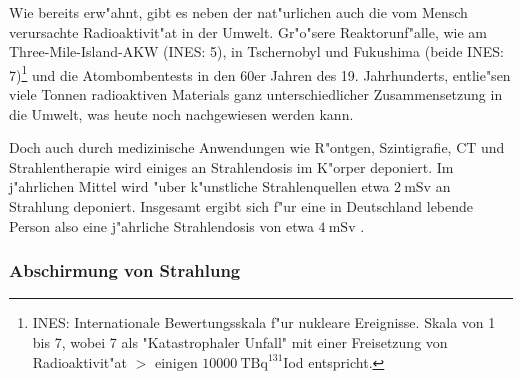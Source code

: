 \documentclass[12pt]{article}
\begin{document}
Wie bereits erw"ahnt, gibt es neben der nat"urlichen auch die vom Mensch verursachte Radioaktivit"at in der Umwelt. Gr"o"sere Reaktorunf"alle, wie am Three-Mile-Island-AKW (INES: 5), in Tschernobyl und Fukushima (beide INES: 7)\footnote{INES: Internationale Bewertungsskala f"ur nukleare Ereignisse. Skala von 1 bis 7, wobei 7 als "Katastrophaler Unfall" mit einer Freisetzung von Radioaktivit"at $>$ einigen $\SI{10000}{\tera\becquerel} ^{131}$Iod entspricht.} und die Atombombentests in den 60er Jahren des 19. Jahrhunderts, entlie"sen viele Tonnen radioaktiven Materials ganz unterschiedlicher Zusammensetzung in die Umwelt, was heute noch nachgewiesen werden kann. \par 
Doch auch durch medizinische Anwendungen wie R"ontgen, Szintigrafie, CT und Strahlentherapie wird einiges an Strahlendosis im K"orper deponiert. Im j"ahrlichen Mittel wird "uber k"unstliche Strahlenquellen etwa $\SI{2}{\milli\sievert}$ an Strahlung deponiert. Insgesamt ergibt sich f"ur eine in Deutschland lebende Person also eine j"ahrliche Strahlendosis von etwa $\SI{4}{\milli\sievert}$ \cite{cite4}. 


\subsubsection{Abschirmung von Strahlung}
\end{document}
